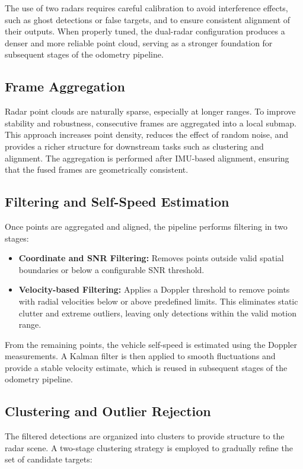 The use of two radars requires careful calibration to avoid interference effects, such as ghost detections or false targets, and to ensure consistent alignment of their outputs.  
When properly tuned, the dual-radar configuration produces a denser and more reliable point cloud, serving as a stronger foundation for subsequent stages of the odometry pipeline.

\subsection*{Frame Aggregation}
Radar point clouds are naturally sparse, especially at longer ranges. 
To improve stability and robustness, consecutive frames are aggregated into a local submap. 
This approach increases point density, reduces the effect of random noise, and provides a richer structure for downstream tasks such as clustering and alignment. 
The aggregation is performed after IMU-based alignment, ensuring that the fused frames are geometrically consistent. 

\subsection*{Filtering and Self-Speed Estimation}
Once points are aggregated and aligned, the pipeline performs filtering in two stages:

\begin{itemize}
    \item \textbf{Coordinate and SNR Filtering:} Removes points outside valid spatial boundaries or below a configurable SNR threshold.
    \item \textbf{Velocity-based Filtering:} Applies a Doppler threshold to remove points with radial velocities below or above predefined limits. This eliminates static clutter and extreme outliers, leaving only detections within the valid motion range.
\end{itemize}

From the remaining points, the vehicle self-speed is estimated using the Doppler measurements. 
A Kalman filter is then applied to smooth fluctuations and provide a stable velocity estimate, which is reused in subsequent stages of the odometry pipeline.

\subsection*{Clustering and Outlier Rejection}
The filtered detections are organized into clusters to provide structure to the radar scene. 
A two-stage clustering strategy is employed to gradually refine the set of candidate targets:  

